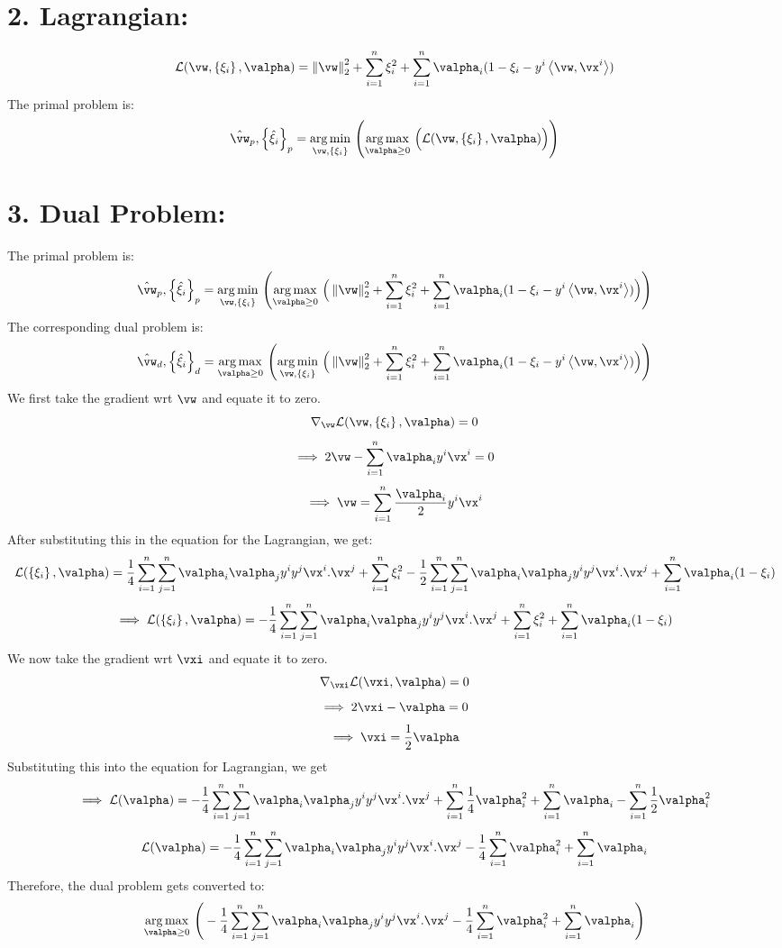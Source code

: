 \documentclass[a4paper,11pt]{article}
\begin{document}
\begin{mlsolution}
\section*{2. Lagrangian:}
$$\mathcal{L}(\vw,\bc{\xi_i},\valpha) =  \norm{\vw}_2^2 + \sum_{i=1}^n\xi_i^2 + \sum_{i=1}^n\valpha_i (1- \xi_i - y^i\ip{\vw}{\vx^i})  $$
The primal problem is:
$$\hat{\vw}_p, \bc{\hat{\xi}_i}_p = \underset{\vw,\bc{\xi_i}}{\arg\min} \ \Bigg(\underset{\valpha \geq 0}{\arg\max}\  \Big(\mathcal{L}(\vw,\bc{\xi_i},\valpha)\Big) \Bigg)   $$

\section*{3. Dual Problem:}
The primal problem is:
$$\hat{\vw}_p, \bc{\hat{\xi}_i}_p = \underset{\vw,\bc{\xi_i}}{\arg\min} \ \Bigg(\underset{\valpha \geq 0}{\arg\max}\  \Big(\norm{\vw}_2^2 + \sum_{i=1}^n\xi_i^2 + \sum_{i=1}^n\valpha_i (1- \xi_i - y^i\ip{\vw}{\vx^i})\Big) \Bigg)   $$
The corresponding dual problem is:
$$\hat{\vw}_d, \bc{\hat{\xi}_i}_d = \underset{\valpha \geq 0}{\arg\max} \ \Bigg(\underset{\vw,\bc{\xi_i}}{\arg\min}\  \Big(\norm{\vw}_2^2 + \sum_{i=1}^n\xi_i^2 + \sum_{i=1}^n\valpha_i (1- \xi_i - y^i\ip{\vw}{\vx^i})\Big) \Bigg)   $$
We first take the gradient wrt $\vw$ and equate it to zero.
$$\nabla_\vw\mathcal{L}(\vw,\bc{\xi_i},\valpha) = 0$$
$$\implies 2\vw - \sum_{i=1}^n\valpha_i y^i{\vx^i} = 0  $$
$$\implies \vw = \sum_{i=1}^n\frac{\valpha_i}{2}y^i{\vx^i}$$
After substituting this in the equation for the Lagrangian, we get:
$$\mathcal{L}(\bc{\xi_i},\valpha) = \frac{1}{4}\sum_{i=1}^n \sum_{j=1}^n\valpha_i\valpha_j y^i y^j {\vx^i.}{\vx^j} + \sum_{i=1}^n\xi_i^2 - \frac{1}{2}\sum_{i=1}^n \sum_{j=1}^n\valpha_i\valpha_j y^i y^j {\vx^i.}{\vx^j} + \sum_{i=1}^n\valpha_i (1- \xi_i) $$
$$\implies \mathcal{L}(\bc{\xi_i},\valpha) = -\frac{1}{4}\sum_{i=1}^n \sum_{j=1}^n\valpha_i\valpha_j y^i y^j {\vx^i.}{\vx^j} + \sum_{i=1}^n\xi_i^2 + \sum_{i=1}^n\valpha_i (1- \xi_i)$$
We now take the gradient wrt $\vxi$ and equate it to zero.
$$\nabla_\vxi\mathcal{L}(\vxi,\valpha) = 0$$
$$\implies 2\vxi - \valpha = 0$$
$$\implies \vxi = \frac{1}{2} \valpha$$
Substituting this into the equation for Lagrangian, we get
$$\implies \mathcal{L}(\valpha) = -\frac{1}{4}\sum_{i=1}^n \sum_{j=1}^n\valpha_i\valpha_j y^i y^j {\vx^i.}{\vx^j} + \sum_{i=1}^n\frac{1}{4}\valpha_i^2 + \sum_{i=1}^n\valpha_i  - \sum_{i=1}^n\frac{1}{2}\valpha_i^2$$
$$\mathcal{L}(\valpha) = -\frac{1}{4}\sum_{i=1}^n \sum_{j=1}^n\valpha_i\valpha_j y^i y^j {\vx^i.}{\vx^j} - \frac{1}{4}\sum_{i=1}^n\valpha_i^2 + \sum_{i=1}^n\valpha_i$$
Therefore, the dual problem gets converted to:
$$ \underset{\valpha \geq 0}{\arg \max} \ \Bigg( -\frac{1}{4}\sum_{i=1}^n \sum_{j=1}^n\valpha_i\valpha_j y^i y^j {\vx^i.}{\vx^j} - \frac{1}{4}\sum_{i=1}^n\valpha_i^2 + \sum_{i=1}^n\valpha_i \Bigg) $$


\end{mlsolution}
\end{document}
